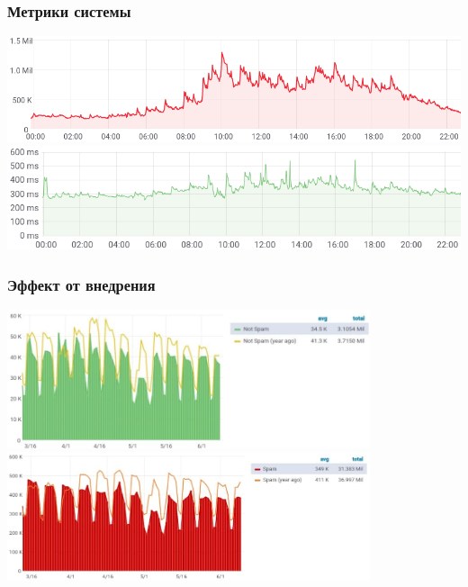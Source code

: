 \documentclass[compress,professionalfont]{beamer}
\begin{document}
\begin{frame}
\frametitle{Метрики системы}

\begin{center}
\includegraphics[width=1.0\textwidth]{processed_messages.png}
\includegraphics[width=1.0\textwidth]{timings.png}
\end{center}

\end{frame}

\begin{frame}
\frametitle{Эффект от внедрения}

\begin{center}
\includegraphics[width=0.8\textwidth]{is_not_spam_yeas_2_yeas.jpg}
\includegraphics[width=0.8\textwidth]{is_spam_yeas_2_yeas.jpg}
\end{center}

\end{frame}
\end{document}
